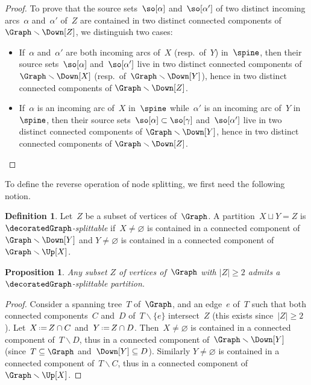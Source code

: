 \documentclass{amsart}
\newtheorem{proposition}[theorem]{Proposition}
\theoremstyle{definition}
\newtheorem{definition}[theorem]{Definition}
\newcommand{\ssm}{\smallsetminus} %
\newcommand{\eqdef}{\mbox{\,\raisebox{0.2ex}{\scriptsize\ensuremath{\mathrm:}}\ensuremath{=}\,}} %
\newcommand{\darkblue}{\color{darkblue}} %
\newcommand{\defn}[1]{\textsl{\darkblue #1}} %
\begin{document}
\begin{proof}
  To prove that the source sets~$\so[\alpha]$ and~$\so[\alpha']$ of two distinct incoming arcs~$\alpha$ and~$\alpha'$ of~$Z$ are contained in two distinct connected components of~$\Graph \ssm \Down[Z]$, we distinguish two cases:
  \begin{itemize}
    \item If~$\alpha$ and~$\alpha'$ are both incoming arcs of~$X$ (resp.~of~$Y$) in~$\spine$, then their source sets~$\so[\alpha]$ and~$\so[\alpha']$ live in two distinct connected components of $\Graph \ssm \Down[X]$ (resp.~of~$\Graph \ssm \Down[Y]$), hence in two distinct connected components of $\Graph \ssm \Down[Z]$.
    \item If~$\alpha$ is an incoming arc of~$X$ in~$\spine$ while~$\alpha'$ is an incoming arc of~$Y$ in~$\spine$, then their source sets~$\so[\alpha] \subset \so[\gamma]$ and~$\so[\alpha']$ live in two distinct connected components of $\Graph \ssm \Down[Y]$, hence in two distinct connected components of $\Graph \ssm \Down[Z]$.
    \qedhere
  \end{itemize}
\end{proof}

To define the reverse operation of node splitting, we first need the following notion.

\begin{definition}
  \label{def:splittable}
  Let~$Z$ be a subset of vertices of~$\Graph$.
  A partition~$X \sqcup Y = Z$ is \defn{$\decoratedGraph$-splittable} if~$X \ne \varnothing$ is contained in a connected component of~$\Graph \ssm \Down[Y]$ and $Y \ne \varnothing$ is contained in a connected component of~$\Graph \ssm \Up[X]$.
\end{definition}

\begin{proposition}
  \label{prop:splittablePartitions}
  Any subset $Z$ of vertices of~$\Graph$ with $|Z| \ge 2$ admits a $\decoratedGraph$-splittable partition.
\end{proposition}

\begin{proof} 
  Consider a spanning tree~$T$ of~$\Graph$, and an edge~$e$ of~$T$ such that both connected components~$C$ and~$D$ of~$T \ssm \{e\}$ intersect~$Z$ (this exists since~$|Z| \ge 2$).
  Let~$X \eqdef Z \cap C$ and~$Y \eqdef Z \cap D$.
  Then~$X \ne \varnothing$ is contained in a connected component of~$T \ssm D$, thus in a connected component of~$\Graph \ssm \Down[Y]$ (since~$T \subseteq \Graph$ and~$\Down[Y] \subseteq D$).
  Similarly $Y \ne \varnothing$ is contained in a connected component of~$T \ssm C$, thus in a connected component of~$\Graph \ssm \Up[X]$.
\end{proof}
\end{document}
